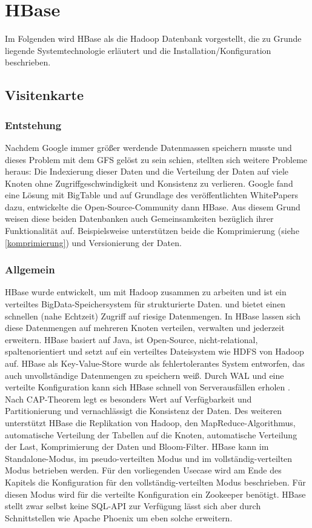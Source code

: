 \section{HBase}



Im Folgenden wird HBase als die Hadoop Datenbank vorgestellt, die zu Grunde liegende Systemtechnologie erläutert  und die Installation/Konfiguration beschrieben.
\subsection{Visitenkarte}
\subsubsection{Entstehung}
Nachdem Google immer größer werdende Datenmassen speichern musste und dieses Problem mit dem  \ac{GFS} gelöst zu sein schien, stellten sich weitere Probleme heraus: 
Die Indexierung dieser Daten und die Verteilung der Daten auf viele Knoten ohne Zugriffgeschwindigkeit und Konsistenz zu verlieren. Google fand eine Lösung mit BigTable und auf Grundlage des veröffentlichten WhitePapers \cite{bigtable} dazu, entwickelte die Open-Source-Community dann HBase. Aus diesem Grund weisen diese beiden Datenbanken auch Gemeinsamkeiten bezüglich ihrer Funktionalität auf. Beispielsweise unterstützen beide die Komprimierung (siehe \ref{komprimierung}) und Versionierung der Daten.

\subsubsection{Allgemein}
HBase wurde entwickelt, um mit Hadoop zusammen zu arbeiten und ist ein verteiltes BigData-Speichersystem für strukturierte Daten. 
 und bietet einen schnellen (nahe Echtzeit) Zugriff auf riesige Datenmengen. In HBase lassen sich diese Datenmengen auf mehreren Knoten verteilen, verwalten und jederzeit erweitern. HBase basiert auf Java, ist Open-Source, nicht-relational, spaltenorientiert und setzt auf ein verteiltes Dateisystem wie HDFS von Hadoop auf. HBase als Key-Value-Store wurde als fehlertolerantes System entworfen, das auch unvollständige Datenmengen zu speichern weiß. Durch \ac{WAL} und eine verteilte Konfiguration kann sich HBase schnell von Serverausfällen erholen \cite{Redt01}. Nach CAP-Theorem legt es besonders Wert auf Verfügbarkeit und Partitionierung und vernachlässigt die Konsistenz der Daten. Des weiteren unterstützt HBase die Replikation von Hadoop, den MapReduce-Algorithmus, automatische Verteilung der Tabellen auf die Knoten, automatische Verteilung der Last, Komprimierung der Daten und Bloom-Filter. HBase kann im Standalone-Modus, im pseudo-verteilten Modus und im vollständig-verteilten Modus betrieben werden. Für den vorliegenden Usecase wird am Ende des Kapitels die Konfiguration für den vollständig-verteilten Modus beschrieben. Für diesen Modus wird für die verteilte Konfiguration ein Zookeeper benötigt. HBase stellt zwar selbst keine SQL-API zur Verfügung lässt sich aber durch Schnittstellen wie Apache Phoenix um eben solche erweitern.

